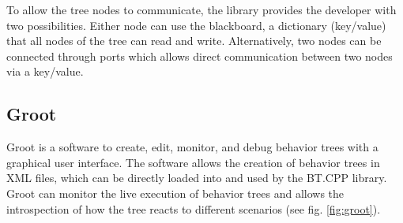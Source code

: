\begin{table}[ht]
	\centering
	\caption{Decorator Nodes in BT.CPP}
	\label{tab:decorators_bt}
	\renewcommand{\arraystretch}{1.5}
\end{table}

To allow the tree nodes to communicate, the library provides the developer with two possibilities. Either node can use the blackboard, a dictionary (key/value) that all nodes of the tree can read and write. Alternatively, two nodes can be connected through ports which allows direct communication between two nodes via a key/value.

\subsection{Groot}

Groot is a software to create, edit, monitor, and debug behavior trees with a graphical user interface. The software allows the creation of behavior trees in XML files, which can be directly loaded into and used by the BT.CPP library. Groot can monitor the live execution of behavior trees and allows the introspection of how the tree reacts to different scenarios (see fig. \ref{fig:groot}).

